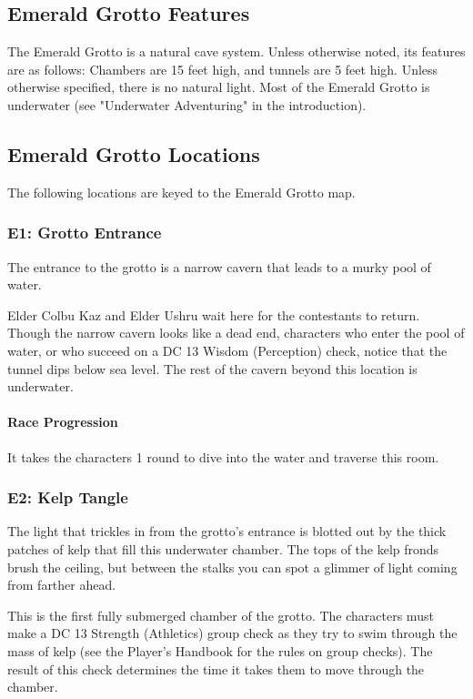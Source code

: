\documentclass[10pt,a4,twoside,twocolumn,openany,nodeprecatedcode]{dndbook}
\begin{document}
\subsection{Emerald Grotto Features}
The Emerald Grotto is a natural cave system. Unless otherwise noted, its features are as follows:
{{Chambers are 15 feet high, and tunnels are 5 feet high.}}
{{Unless otherwise specified, there is no natural light.}}
{{Most of the Emerald Grotto is underwater (see "Underwater Adventuring" in the introduction).}}
\subsection{Emerald Grotto Locations}
The following locations are keyed to the Emerald Grotto map.
\subsubsection{E1: Grotto Entrance}
\begin{DndReadAloud}{}
The entrance to the grotto is a narrow cavern that leads to a murky pool of water.
\end{DndReadAloud}

Elder Colbu Kaz and Elder Ushru wait here for the contestants to return.
Though the narrow cavern looks like a dead end, characters who enter the pool of water, or who succeed on a DC 13 Wisdom (Perception) check, notice that the tunnel dips below sea level. The rest of the cavern beyond this location is underwater.
\paragraph{Race Progression}
It takes the characters 1 round to dive into the water and traverse this room.
\subsubsection{E2: Kelp Tangle}
\begin{DndReadAloud}{}
The light that trickles in from the grotto's entrance is blotted out by the thick patches of kelp that fill this underwater chamber. The tops of the kelp fronds brush the ceiling, but between the stalks you can spot a glimmer of light coming from farther ahead.
\end{DndReadAloud}

This is the first fully submerged chamber of the grotto. The characters must make a DC 13 Strength (Athletics) group check as they try to swim through the mass of kelp (see the Player's Handbook for the rules on group checks). The result of this check determines the time it takes them to move through the chamber.
\end{document}
